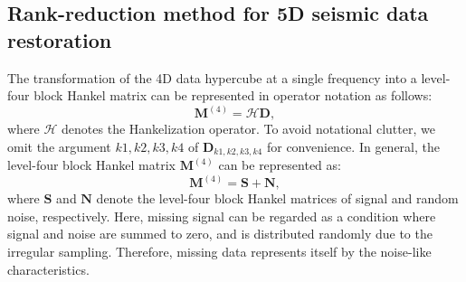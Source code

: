 \subsection{Rank-reduction method for 5D seismic data restoration}
The transformation of the 4D data hypercube at a single frequency into a level-four block Hankel matrix can be represented in operator notation as follows:
\begin{equation}
\label{eq:hankelopt}
\mathbf{M}^{(4)}=\mathcal{H}\mathbf{D},
\end{equation}
where $\mathcal{H}$ denotes the Hankelization operator.  To avoid notational clutter, we omit the argument $k1,k2,k3,k4$ of $\mathbf{D}_{k1,k2,k3,k4}$ for convenience. In general, the level-four block Hankel matrix $\mathbf{M}^{(4)}$ can be represented as:
\begin{equation}
\label{eq:M}
\mathbf{M}^{(4)}=\mathbf{S}+\mathbf{N},
\end{equation}
where $\mathbf{S}$ and $\mathbf{N}$ denote the level-four block Hankel matrices of signal and random noise, respectively. Here, missing signal can be regarded as  a condition where signal and noise are summed to zero, and is distributed randomly due to the irregular sampling. Therefore, missing data represents itself by the noise-like characteristics. 

